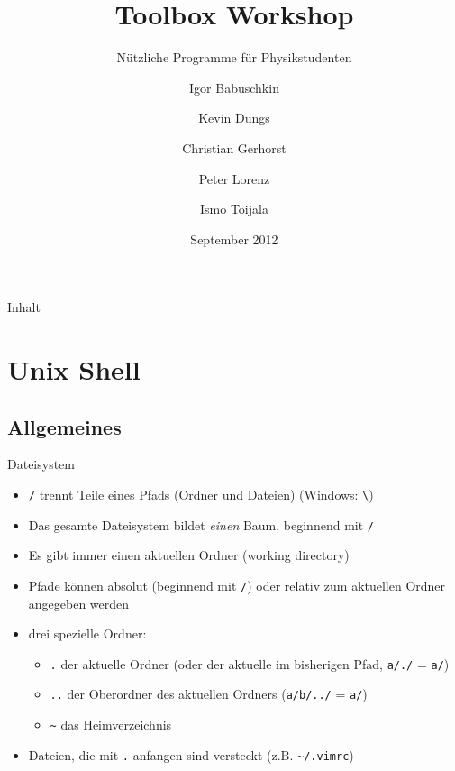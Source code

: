 \documentclass[t]{beamer}
\title{Toolbox Workshop}
\subtitle{Nützliche Programme für Physikstudenten}
\author[Igor B.\and Kevin D.\and Christian G.\and Peter L.\and Ismo T.]{
  Igor Babuschkin%
  \and Kevin Dungs%
  \and Christian Gerhorst%
  \and Peter Lorenz%
  \and Ismo Toijala%
}
\institute[PeP et al. e.V.]{PeP et al. e.V.\thanks{\href{http://pep-dortmund.org}{pep-dortmund.org}}}
\date{September 2012}
\begin{document}
{
  \begin{frame}
    \titlepage
  \end{frame}
}

  \begin{frame}{Inhalt}
    \tableofcontents
  \end{frame}

  \section{Unix Shell}
    \subsection{Allgemeines}
      \begin{frame}{Dateisystem}
        \begin{itemize}
          \item \texttt{/} trennt Teile eines Pfads (Ordner und Dateien) (Windows: \texttt{\textbackslash})
          \item Das gesamte Dateisystem bildet \emph{einen} Baum, beginnend mit \texttt{/}
          \item Es gibt immer einen aktuellen Ordner (working directory)
          \item Pfade können absolut (beginnend mit \texttt{/}) oder relativ zum aktuellen Ordner angegeben werden
          \item drei spezielle Ordner:
            \begin{itemize}
              \item \texttt{.} der aktuelle Ordner (oder der aktuelle im bisherigen Pfad, \texttt{a/./} = \texttt{a/})
              \item \texttt{..} der Oberordner des aktuellen Ordners (\texttt{a/b/../} = \texttt{a/})
              \item \texttt{\textasciitilde} das Heimverzeichnis
            \end{itemize}
          \item Dateien, die mit \texttt{.} anfangen sind versteckt (z.B. \texttt{\textasciitilde/.vimrc})
        \end{itemize}
      \end{frame}
\end{document}
